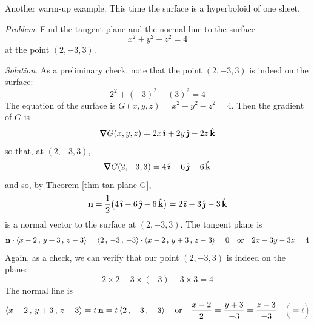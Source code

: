Another warm-up example. This time the surface is a hyperboloid of one sheet.

\begin{eg}\label{eg tan plane D}
\noindent\textit{Problem}:
Find the tangent plane and the normal line to the surface
\begin{equation*}
x^2+y^2-z^2 = 4
\end{equation*}
at the point $(2,-3,3)$.

\medskip
\noindent\textit{Solution}. 
As a preliminary check, note that the point $(2,-3,3)$ is indeed on the surface:
\begin{equation*}
2^2+(-3)^2-(3)^2=4
\end{equation*} 
The equation of the surface is $G(x,y,z)=x^2+y^2-z^2=4$.
Then the gradient of $G$ is
\begin{align*}
\vnabla G(x,y,z) = 2x\,\hi +2y\,\hj-2z\,\hk
\end{align*}
so that, at $(2,-3,3)$,
\begin{equation*}
\vnabla G(2,-3,3) = 4\,\hi -6\,\hj-6\,\hk
\end{equation*}
and so, by Theorem \ref{thm tan plane G},
\begin{equation*}
\mathbf{n} = \frac{1}{2}\big(4\,\hat{\pmb{\imath}} -6\,\hat{\pmb{\jmath}}-6\,\hat{\mathbf{k}}\big)=2\,\hat{\pmb{\imath}}-3\,\hat{\pmb{\jmath}}-3\,\hat{\mathbf{k}}
\end{equation*}
is a normal vector to the surface at $(2,-3,3)$. The tangent plane is
\begin{equation*}
\mathbf{n}\cdot\left< x-2\,,\,y+3\,,\,z-3 \right>
=\left< 2\,,\,-3\,,\, -3\right>\cdot\left< x-2\,,\,y+3\,,\,z-3 \right>
=0\quad\text{or}\quad
2x -3y -3z = 4
\end{equation*}
Again, as a check, we can verify that our point $(2,-3,3)$ is indeed on 
the plane:
\begin{equation*}
2\times 2 - 3\times(-3) -3\times 3 = 4
\end{equation*}
 The normal line is
\begin{equation*}
\llt x-2\,,\,y+3\,,\,z-3 \rgt
=t\,\vn = t\llt 2\,,\,-3\,,\, -3\rgt
\quad\text{or}\quad
\frac{x-2}{2} = \frac{y+3}{-3} = \frac{z-3}{-3}\quad 
  \textcolor{gray}{\Big(=t\Big)}
\end{equation*} 

\end{eg}


